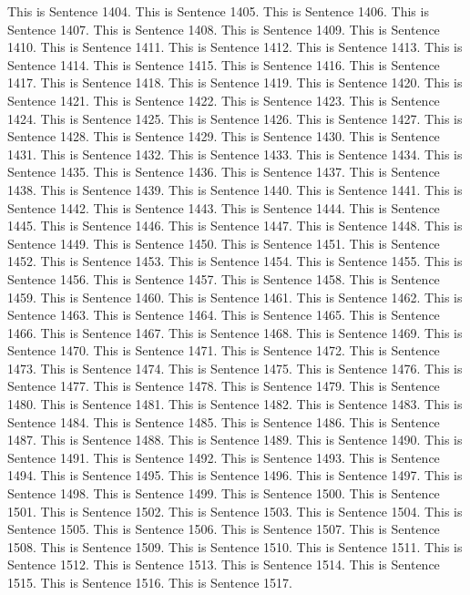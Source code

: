 \documentclass{article}
\begin{document}
This is Sentence 1404.
This is Sentence 1405.
This is Sentence 1406.
This is Sentence 1407.
This is Sentence 1408.
This is Sentence 1409.
This is Sentence 1410.
This is Sentence 1411.
This is Sentence 1412.
This is Sentence 1413.
This is Sentence 1414.
This is Sentence 1415.
This is Sentence 1416.
This is Sentence 1417.
This is Sentence 1418.
This is Sentence 1419.
This is Sentence 1420.
This is Sentence 1421.
This is Sentence 1422.
This is Sentence 1423.
This is Sentence 1424.
This is Sentence 1425.
This is Sentence 1426.
This is Sentence 1427.
This is Sentence 1428.
This is Sentence 1429.
This is Sentence 1430.
This is Sentence 1431.
This is Sentence 1432.
This is Sentence 1433.
This is Sentence 1434.
This is Sentence 1435.
This is Sentence 1436.
This is Sentence 1437.
This is Sentence 1438.
This is Sentence 1439.
This is Sentence 1440.
This is Sentence 1441.
This is Sentence 1442.
This is Sentence 1443.
This is Sentence 1444.
This is Sentence 1445.
This is Sentence 1446.
This is Sentence 1447.
This is Sentence 1448.
This is Sentence 1449.
This is Sentence 1450.
This is Sentence 1451.
This is Sentence 1452.
This is Sentence 1453.
This is Sentence 1454.
This is Sentence 1455.
This is Sentence 1456.
This is Sentence 1457.
This is Sentence 1458.
This is Sentence 1459.
This is Sentence 1460.
This is Sentence 1461.
This is Sentence 1462.
This is Sentence 1463.
This is Sentence 1464.
This is Sentence 1465.
This is Sentence 1466.
This is Sentence 1467.
This is Sentence 1468.
This is Sentence 1469.
This is Sentence 1470.
This is Sentence 1471.
This is Sentence 1472.
This is Sentence 1473.
This is Sentence 1474.
This is Sentence 1475.
This is Sentence 1476.
This is Sentence 1477.
This is Sentence 1478.
This is Sentence 1479.
This is Sentence 1480.
This is Sentence 1481.
This is Sentence 1482.
This is Sentence 1483.
This is Sentence 1484.
This is Sentence 1485.
This is Sentence 1486.
This is Sentence 1487.
This is Sentence 1488.
This is Sentence 1489.
This is Sentence 1490.
This is Sentence 1491.
This is Sentence 1492.
This is Sentence 1493.
This is Sentence 1494.
This is Sentence 1495.
This is Sentence 1496.
This is Sentence 1497.
This is Sentence 1498.
This is Sentence 1499.
This is Sentence 1500.
This is Sentence 1501.
This is Sentence 1502.
This is Sentence 1503.
This is Sentence 1504.
This is Sentence 1505.
This is Sentence 1506.
This is Sentence 1507.
This is Sentence 1508.
This is Sentence 1509.
This is Sentence 1510.
This is Sentence 1511.
This is Sentence 1512.
This is Sentence 1513.
This is Sentence 1514.
This is Sentence 1515.
This is Sentence 1516.
This is Sentence 1517.
\end{document}

